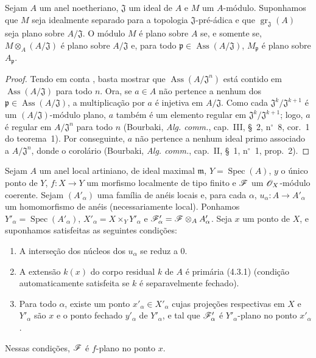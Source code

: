 \begin{corollary}[11.4.10]
\label{IV.11.4.10}
Sejam $A$ um anel
noetheriano, $\mathfrak J$
um ideal de $A$ e $M$ um
$A$-módulo. Suponhamos que
$M$ seja idealmente separado
para a topologia
$\mathfrak J$-pré-ádica e
que
$\operatorname{gr}_{\mathfrak J}(A)$
seja plano sobre
$A/\mathfrak J$.
O módulo $M$ é plano sobre
$A$ se, e somente se,
$M\otimes_A(A/\mathfrak J)$
é plano sobre $A/\mathfrak J$
e, para todo
$\mathfrak p\in
\operatorname{Ass}
(A/\mathfrak J)$,
$M_\mathfrak p$ é plano
sobre $A_\mathfrak p$.
\end{corollary}

\begin{proof}
Tendo em conta
, basta
mostrar que
$\operatorname{Ass}
(A/\mathfrak J^n)$ está
contido em
$\operatorname{Ass}
(A/\mathfrak J)$ para
todo $n$. Ora, se
$a\in A$ não pertence a
nenhum dos
$\mathfrak p\in
\operatorname{Ass}
(A/\mathfrak J)$, a
multiplicação por $a$ é
injetiva em $A/\mathfrak J$.
Como cada
$\mathfrak J^k/
\mathfrak J^{k+1}$ é um
$(A/\mathfrak J)$-módulo
plano, $a$ também é um
elemento regular em
$\mathfrak J^k/
\mathfrak J^{k+1}$;
logo, $a$ é regular em
$A/\mathfrak J^n$ para
todo $n$ (Bourbaki,
\emph{Alg. comm.}, cap.~III,
\S~2, n$^\circ$~8,
cor.~1 do teorema~1).
Por conseguinte, $a$ não
pertence a nenhum ideal
primo associado a
$A/\mathfrak J^n$, donde
o corolário (Bourbaki,
\emph{Alg. comm.}, cap.~II,
\S~1, n$^\circ$~1,
prop.~2).
\end{proof}

\begin{proposition}[11.4.11]
\label{IV.11.4.11}
Sejam $A$ um anel local
artiniano, de ideal maximal
$\mathfrak m$,
$Y=\operatorname{Spec}(A)$,
$y$ o único ponto de $Y$,
$f:X\to Y$ um morfismo
localmente de tipo finito e
$\mathscr{F}$ um
$\mathscr{O}_X$-módulo coerente.
Sejam $(A'_\alpha)$ uma
família de anéis locais e,
para cada $\alpha$,
$u_\alpha:A\to A'_\alpha$
um homomorfismo de anéis
(necessariamente local).
Ponhamos
$Y'_\alpha=
\operatorname{Spec}(A'_\alpha)$,
$X'_\alpha=
X\times_Y Y'_\alpha$ e
$\mathscr{F}'_\alpha=
\mathscr{F}\otimes_A A'_\alpha$.
Seja $x$ um ponto de $X$,
e suponhamos satisfeitas as
seguintes condições:
\begin{enumerate}[label=(\roman*)]
\item A interseção dos
núcleos dos $u_\alpha$
se reduz a $0$.
\item A extensão $k(x)$
do corpo residual $k$ de
$A$ é primária
(4.3.1)
(condição automaticamente
satisfeita se $k$ é
separavelmente fechado).
\item Para todo $\alpha$,
existe um ponto
$x'_\alpha\in X'_\alpha$
cujas projeções respectivas
em $X$ e $Y'_\alpha$
são $x$ e o ponto fechado
$y'_\alpha$ de
$Y'_\alpha$, e tal que
$\mathscr{F}'_\alpha$ é
$Y'_\alpha$-plano no ponto
$x'_\alpha$.
\end{enumerate}
Nessas condições, $\mathscr{F}$
é $f$-plano no ponto $x$.
\end{proposition}

